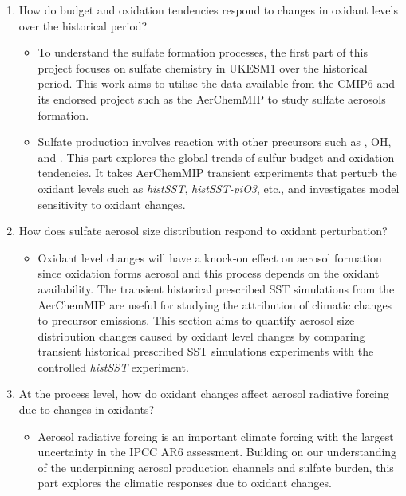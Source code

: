 \begin{enumerate}
    \item  How do  budget and oxidation tendencies respond to changes in oxidant levels over the historical period?
    \begin{itemize}
        \item To understand the sulfate formation processes, the first part of this project focuses on sulfate chemistry in UKESM1 over the historical period. This work aims to utilise the data available from the CMIP6 and its endorsed project such as the AerChemMIP to study sulfate aerosols formation.  
        \item Sulfate production involves  reaction with other precursors such as , OH, and . This part explores the global trends of sulfur budget and oxidation tendencies. It takes AerChemMIP transient experiments that perturb the oxidant levels such as \textit{histSST}, \textit{histSST-piO3}, etc., and investigates model sensitivity to oxidant changes. 
    \end{itemize}

    \item How does sulfate aerosol size distribution respond to oxidant perturbation?

    \begin{itemize}
        \item Oxidant level changes will have a knock-on effect on aerosol formation since  oxidation forms aerosol and this process depends on the oxidant availability. The transient historical prescribed SST simulations from the AerChemMIP are useful for studying the attribution of climatic changes to precursor emissions. This section aims to quantify aerosol size distribution changes caused by oxidant level changes by comparing transient historical prescribed SST simulations experiments with the controlled \textit{histSST} experiment. 
    \end{itemize}

    \item At the process level, how do oxidant changes affect aerosol radiative forcing due to changes in oxidants?

    \begin{itemize}
        \item Aerosol radiative forcing is an important climate forcing with the largest uncertainty in the IPCC AR6 assessment. Building on our understanding of the underpinning aerosol production channels and sulfate burden, this part explores the climatic responses due to oxidant changes. 
    \end{itemize}


\end{enumerate}

